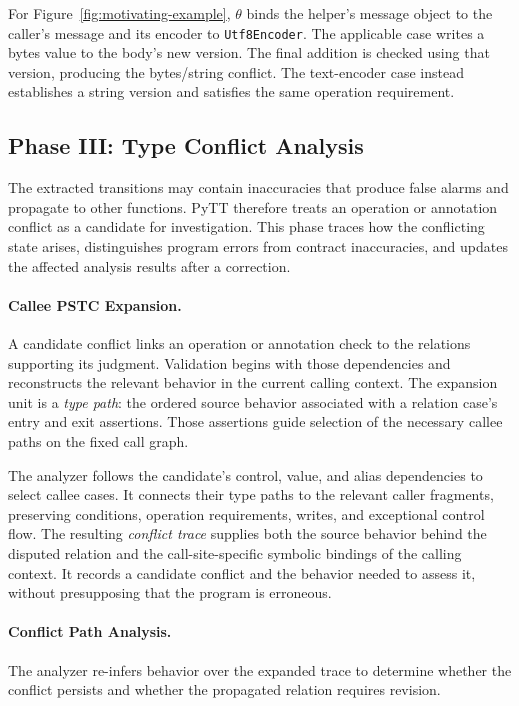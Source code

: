 For Figure~\ref{fig:motivating-example}, $\theta$ binds the helper's message
object to the caller's message and its encoder to \texttt{Utf8Encoder}.
The applicable case writes a bytes value to the body's new version.
The final addition is checked using that version, producing the bytes/string
conflict. The text-encoder case instead establishes a string version and
satisfies the same operation requirement.

\subsection{Phase III: Type Conflict Analysis}
\label{sec:conflict-analysis}
The extracted transitions may contain inaccuracies that produce false
alarms and propagate to other functions. PyTT therefore treats an
operation or annotation conflict as a candidate for investigation. This
phase traces how the conflicting state arises, distinguishes program
errors from contract inaccuracies, and updates the affected analysis
results after a correction.

\paragraph{Callee PSTC Expansion.}
A candidate conflict links an operation or annotation check to the relations
supporting its judgment. Validation begins with those dependencies and
reconstructs the relevant behavior in the current calling context.
The expansion unit is a \emph{type path}: the ordered source behavior
associated with a relation case's entry and exit assertions. Those
assertions guide selection of the necessary callee paths on the fixed
call graph.

The analyzer follows the candidate's control, value, and alias dependencies
to select callee cases. It connects their type paths to the relevant caller
fragments, preserving conditions, operation requirements, writes, and
exceptional control flow. The resulting \emph{conflict trace} supplies both
the source behavior behind the disputed relation and the call-site-specific symbolic
bindings of the calling context. It records a candidate conflict and the
behavior needed to assess it, without presupposing that the program is
erroneous.

\paragraph{Conflict Path Analysis.}
The analyzer re-infers behavior over the expanded trace to determine
whether the conflict persists and whether the propagated relation
requires revision.

